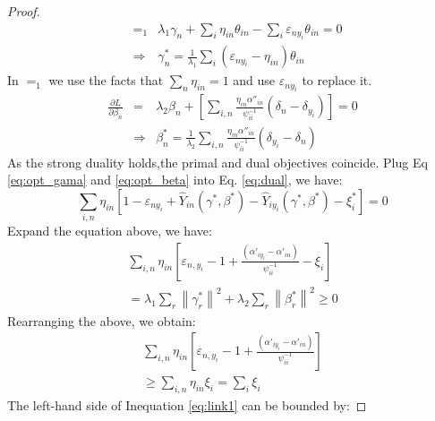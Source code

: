 \begin{proof}
\begin{eqnarray}
&=_1 &{\lambda _1}{\gamma _n} + \sum\limits_i {{\eta _{in}}{\theta _{in}}}  - \sum\limits_i {{\varepsilon _{n{y_i}}}{\theta _{in}}}  = 0  \nonumber\\
&\Rightarrow & \gamma _n^* = \frac{1}{{{\lambda _1}}}\sum\limits_i {\left( {{\varepsilon _{n{y_i}}} - {\eta _{in}}} \right){\theta _{in}}} 
\end{eqnarray}
In $=_1$ we use the facts that $\sum_n\eta_{in}=1$ and use $\varepsilon_{ny_i}$ to replace it.
\begin{eqnarray}\label{eq:opt_beta}
\frac{{\partial L}}{{\partial {\beta _n}}} &=& {\lambda _2}{\beta _n} + \left[ {\sum\limits_{i,n} {\frac{{{\eta _{in}}{{\alpha ''}_{in}}}}{{\psi_{ii}^{ - 1}}}\left( {{\delta _n} - {\delta _{{y_i}}}} \right)} } \right] = 0 \nonumber \\
&\Rightarrow &\beta _n^* = \frac{1}{{{\lambda _2}}}\sum\limits_{i,n} {\frac{{{\eta _{in}}{{\alpha ''}_{in}}}}{{\psi _{ii}^{ - 1}}}\left( {{\delta _{{y_i}}} - {\delta _n}} \right)} 
\end{eqnarray}
As the strong duality holds,the primal and dual objectives coincide. Plug Eq \eqref{eq:opt_gama} and \eqref{eq:opt_beta} into Eq. \eqref{eq:dual}, we have:
\begin{equation*}
\sum\limits_{i,n} {{\eta _{in}}\left[ {1 - {\varepsilon _{n{y_i}}} + {{\hat Y}_{in}}\left( {\gamma^* ,\beta^* } \right) - {{\hat Y}_{i{y_i}}}\left( {\gamma^* ,\beta^* } \right) - {\xi _i^*}} \right]}=0
\end{equation*}
Expand the equation above, we have:
\begin{eqnarray}\nonumber
\sum\limits_{i,n} {{\eta _{in}}\left[ { {\varepsilon _{n,{y_i}}}-1 + \frac{{\left( {{{\alpha '}_{i{y_i}}} - {{\alpha '}_{in}}} \right)}}{{\psi_{ii}^{ - 1}}} - {\xi _i}} \right]} \nonumber\\ 
= {\lambda _1}\sum\limits_r {{{\left\| {\gamma _r^*} \right\|}^2}}  + {\lambda _2}\sum\limits_r {{{\left\| {\beta _r^*} \right\|}^2}}  \ge 0\nonumber
\end{eqnarray}
Rearranging the above, we obtain:
\begin{eqnarray}\label{eq:link1}
\sum\limits_{i,n} {{\eta _{in}}\left[ { {\varepsilon _{n,{y_i}}} -1+ \frac{{\left( {{{\alpha '}_{i{y_i}}} - {{\alpha '}_{in}}} \right)}}{{\psi_{ii}^{ - 1}}}} \right]} \nonumber\\ 
 \ge \sum\limits_{i,n} {{\eta _{in}}{\xi _i}}  = \sum\limits_i {{\xi _i}} 
\end{eqnarray}
The left-hand side of Inequation \eqref{eq:link1} can be bounded by:

\end{proof}
